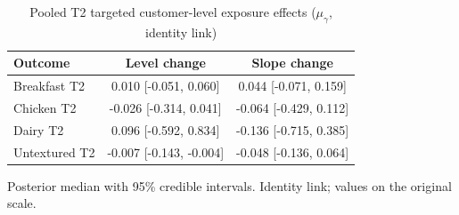 \begin{table}[H]
\centering
\caption{Pooled T2 targeted customer-level exposure effects ($\mu_\gamma$, identity link)}
\label{tab:a6_t2_mu_gamma}
\begin{tabular}{lcc}
\toprule
Outcome & Level change & Slope change \\
\midrule
Breakfast T2 & 0.010 [-0.051, 0.060] & 0.044 [-0.071, 0.159] \\
Chicken T2 & -0.026 [-0.314, 0.041] & -0.064 [-0.429, 0.112] \\
Dairy T2 & 0.096 [-0.592, 0.834] & -0.136 [-0.715, 0.385] \\
Untextured T2 & -0.007 [-0.143, -0.004] & -0.048 [-0.136, 0.064] \\
\bottomrule
\end{tabular}
\par\smallskip\footnotesize Posterior median with 95\% credible intervals. Identity link; values on the original scale.
\end{table}
